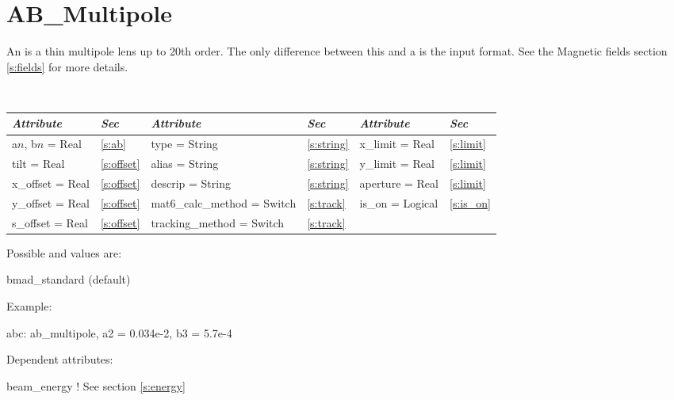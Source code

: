 \vfil
\break

\section{AB\_Multipole}
\label{s:ab_m}

An  is a thin multipole lens up to 20th order. The only
difference between this and a  is the input format. See the 
Magnetic fields section \ref{s:fields} for more details.

\begin{table}[h]
{\centering 
{\tt
\begin{tabular}{|l|l||l|l||l|l|} \hline
  {\sl Attribute} & {\sl Sec}  & {\sl Attribute} & {\sl Sec} & {\sl Attribute} & {\sl Sec} \\ \hline
  a$n$, b$n$ = Real  &  \ref{s:ab}     &  type = String                & \ref{s:string} & x\_limit = Real  & \ref{s:limit} \\ \hline
  tilt       = Real  &  \ref{s:offset} &  alias = String               & \ref{s:string} & y\_limit = Real  & \ref{s:limit} \\ \hline
  x\_offset  = Real  &  \ref{s:offset} &  descrip = String             & \ref{s:string} & aperture = Real  & \ref{s:limit} \\ \hline
  y\_offset  = Real  &  \ref{s:offset} &  mat6\_calc\_method = Switch  & \ref{s:track}  & is\_on = Logical & \ref{s:is_on} \\ \hline
  s\_offset  = Real  &  \ref{s:offset} &  tracking\_method = Switch    & \ref{s:track}  &                  &               \\ \hline
\end{tabular}
}}
\end{table}

\noindent
Possible  and  values are:
\vskip 0.01in
\begin{example}
   bmad\_standard  (default) 
\end{example}

\vskip0.2in \noindent
Example:
\begin{example}
  abc: ab_multipole, a2 = 0.034e-2, b3 = 5.7e-4
\end{example}

\vskip0.1in \noindent
Dependent attributes:
\begin{example}
  beam\_energy  ! See section \ref{s:energy}
\end{example}

